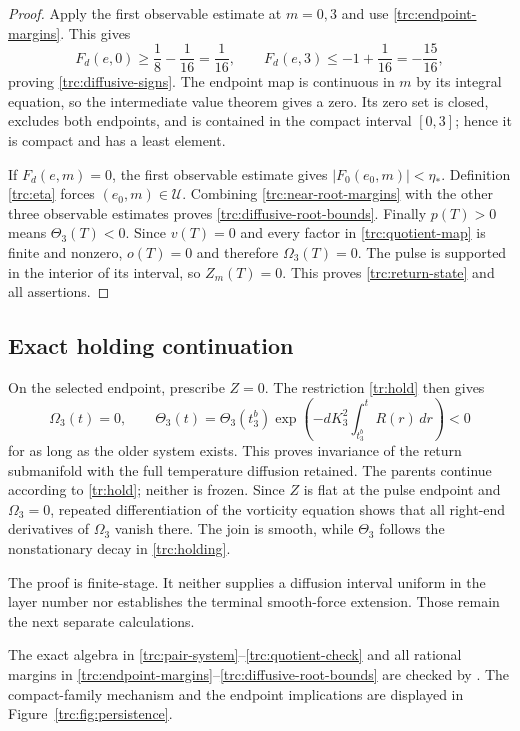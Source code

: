\begin{proof}
Apply the first observable estimate at $m=0,3$ and use
\eqref{trc:endpoint-margins}.  This gives
\[
 F_d(e,0)\geq\frac18-\frac1{16}=\frac1{16},\qquad
 F_d(e,3)\leq-1+\frac1{16}=-\frac{15}{16},
\]
proving \eqref{trc:diffusive-signs}.  The endpoint map is continuous in
$m$ by its integral equation, so the intermediate value theorem gives a
zero.  Its zero set is closed, excludes both endpoints, and is contained
in the compact interval $[0,3]$; hence it is compact and has a least
element.

If $F_d(e,m)=0$, the first observable estimate gives
$|F_0(e_0,m)|<\eta_*$.  Definition \eqref{trc:eta} forces
$(e_0,m)\in\mathcal U$.  Combining
\eqref{trc:near-root-margins} with the other three observable estimates
proves \eqref{trc:diffusive-root-bounds}.  Finally $p(T)>0$ means
$\Theta_3(T)<0$.  Since $v(T)=0$ and every factor in
\eqref{trc:quotient-map} is finite and nonzero, $o(T)=0$ and therefore
$\Omega_3(T)=0$.  The pulse is supported in the interior of its interval,
so $Z_m(T)=0$.  This proves \eqref{trc:return-state} and all assertions.
\end{proof}

\subsection{Exact holding continuation}

On the selected endpoint, prescribe $Z=0$.  The restriction
\eqref{tr:hold} then gives
\begin{equation}\label{trc:holding}
 \Omega_3(t)=0,\qquad
 \Theta_3(t)=\Theta_3(t_3^b)
 \exp\!\left(-dK_3^2\int_{t_3^b}^{t}R(r)\,dr\right)<0
\end{equation}
for as long as the older system exists.  This proves invariance of the
return submanifold with the full temperature diffusion retained.  The
parents continue according to \eqref{tr:hold}; neither is frozen.  Since
$Z$ is flat at the pulse endpoint and $\Omega_3=0$, repeated
differentiation of the vorticity equation shows that all right-end
derivatives of $\Omega_3$ vanish there.  The join is smooth, while
$\Theta_3$ follows the nonstationary decay in \eqref{trc:holding}.

The proof is finite-stage.  It neither supplies a diffusion interval
uniform in the layer number nor establishes the terminal smooth-force
extension.  Those remain the next separate calculations.

The exact algebra in \eqref{trc:pair-system}--\eqref{trc:quotient-check}
and all rational margins in
\eqref{trc:endpoint-margins}--\eqref{trc:diffusive-root-bounds} are checked
by .  The compact-family
mechanism and the endpoint implications are displayed in
Figure~\ref{trc:fig:persistence}.


